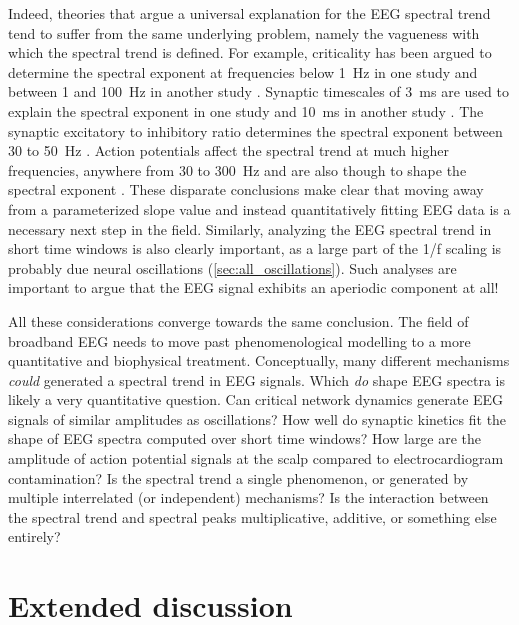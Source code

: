 Indeed, theories that argue a universal explanation for the EEG spectral trend tend to suffer from the same underlying problem, namely the vagueness with which the spectral trend is defined. For example, criticality has been argued to determine the spectral exponent at frequencies below \qty{1}{\hertz} in one study \cite{Chaudhuri2018} and between 1 and \qty{100}{\hertz} in another study \cite{Lombardi2017}. Synaptic timescales of \qty{3}{\milli\second} are used to explain the spectral exponent in one study \cite{Bedard2006} and \qty{10}{\milli\second} in another study \cite{Miller2009}. The synaptic excitatory to inhibitory ratio determines the spectral exponent between 30 to \qty{50}{\hertz} \cite{Gao2017}. Action potentials \cite{Ray2011} affect the spectral trend at much higher frequencies, anywhere from 30 to \qty{300}{\hertz} and are also though to shape the spectral exponent \cite{Gao2017}. These disparate conclusions make clear that moving away from a parameterized slope value and instead quantitatively fitting EEG data is a necessary next step in the field. Similarly, analyzing the EEG spectral trend in short time windows is also clearly important, as a large part of the 1/f scaling is probably due neural oscillations (\autoref{sec:all_oscillations}). Such analyses are important to argue that the EEG signal exhibits an aperiodic component at all!

All these considerations converge towards the same conclusion. The field of broadband EEG needs to move past phenomenological modelling to a more quantitative and biophysical treatment. Conceptually, many different mechanisms \textit{could} generated a spectral trend in EEG signals. Which \textit{do} shape EEG spectra is likely a very quantitative question. Can critical network dynamics generate EEG signals of similar amplitudes as oscillations? How well do synaptic kinetics fit the shape of EEG spectra computed over short time windows? How large are the amplitude of action potential signals at the scalp compared to electrocardiogram contamination? Is the spectral trend a single phenomenon, or generated by multiple interrelated (or independent) mechanisms? Is the interaction between the spectral trend and spectral peaks multiplicative, additive, or something else entirely? 

\section{Extended discussion}



